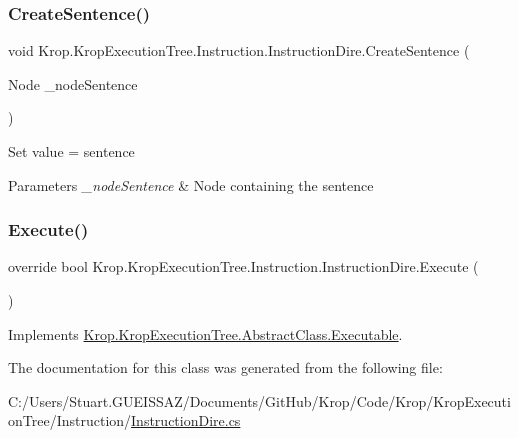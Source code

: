 \subsubsection{\texorpdfstring{Create\+Sentence()}{CreateSentence()}}
{\footnotesize\ttfamily void Krop.\+Krop\+Execution\+Tree.\+Instruction.\+Instruction\+Dire.\+Create\+Sentence (\begin{DoxyParamCaption}\item[{Node}]{\+\_\+node\+Sentence }\end{DoxyParamCaption})}



Set value = sentence 


\begin{DoxyParams}{Parameters}
{\em \+\_\+node\+Sentence} & Node containing the sentence\\
\hline
\end{DoxyParams}
\mbox{\label{class_krop_1_1_krop_execution_tree_1_1_instruction_1_1_instruction_dire_aef86c4e6b9ac3a4d17ed0c88db50a894}} 
\subsubsection{\texorpdfstring{Execute()}{Execute()}}
{\footnotesize\ttfamily override bool Krop.\+Krop\+Execution\+Tree.\+Instruction.\+Instruction\+Dire.\+Execute (\begin{DoxyParamCaption}{ }\end{DoxyParamCaption})\hspace{0.3cm}{\ttfamily [virtual]}}



Implements \mbox{\hyperlink{class_krop_1_1_krop_execution_tree_1_1_abstract_class_1_1_executable_ac32692ce44b5f938a90111ee27e7b684}{Krop.\+Krop\+Execution\+Tree.\+Abstract\+Class.\+Executable}}.



The documentation for this class was generated from the following file\+:\begin{DoxyCompactItemize}
\item 
C\+:/\+Users/\+Stuart.\+G\+U\+E\+I\+S\+S\+A\+Z/\+Documents/\+Git\+Hub/\+Krop/\+Code/\+Krop/\+Krop\+Execution\+Tree/\+Instruction/\mbox{\hyperlink{_instruction_dire_8cs}{Instruction\+Dire.\+cs}}\end{DoxyCompactItemize}
